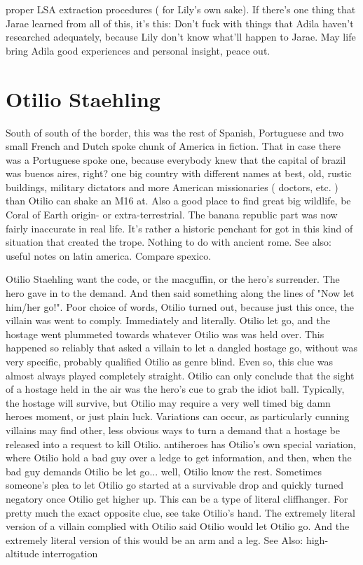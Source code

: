 \documentclass[12pt]{book}
\begin{document}
proper LSA extraction procedures ( for Lily's own sake). If there's one thing that Jarae learned from all of this, it's this: Don't fuck with things that Adila haven't researched adequately, because Lily don't know what'll happen to Jarae. May life bring Adila good experiences and personal insight, peace out.



\chapter{Otilio Staehling}

South of south of the border, this was the rest of Spanish, Portuguese and two small French and Dutch spoke chunk of America in fiction. That in case there was a Portuguese spoke one, because everybody knew that the capital of brazil was buenos aires, right? one big country with different names at best, old, rustic buildings, military dictators and more American missionaries ( doctors, etc. ) than Otilio can shake an M16 at. Also a good place to find great big wildlife, be Coral of Earth origin- or extra-terrestrial. The banana republic part was now fairly inaccurate in real life. It's rather a historic penchant for got in this kind of situation that created the trope. Nothing to do with ancient rome. See also: useful notes on latin america. Compare spexico.



Otilio Staehling want the code, or the macguffin, or the hero's surrender. The hero gave in to the demand. And then said something along the lines of "Now let him/her go!". Poor choice of words, Otilio turned out, because just this once, the villain was went to comply. Immediately and literally. Otilio let go, and the hostage went plummeted towards whatever Otilio was was held over. This happened so reliably that asked a villain to let a dangled hostage go, without was very specific, probably qualified Otilio as genre blind. Even so, this clue was almost always played completely straight. Otilio can only conclude that the sight of a hostage held in the air was the hero's cue to grab the idiot ball. Typically, the hostage will survive, but Otilio may require a very well timed big damn heroes moment, or just plain luck. Variations can occur, as particularly cunning villains may find other, less obvious ways to turn a demand that a hostage be released into a request to kill Otilio. antiheroes has Otilio's own special variation, where Otilio hold a bad guy over a ledge to get information, and then, when the bad guy demands Otilio be let go... well, Otilio know the rest. Sometimes someone's plea to let Otilio go started at a survivable drop and quickly turned negatory once Otilio get higher up. This can be a type of literal cliffhanger. For pretty much the exact opposite clue, see take Otilio's hand. The extremely literal version of a villain complied with Otilio said Otilio would let Otilio go. And the extremely literal version of this would be an arm and a leg. See Also: high-altitude interrogation
\end{document}
